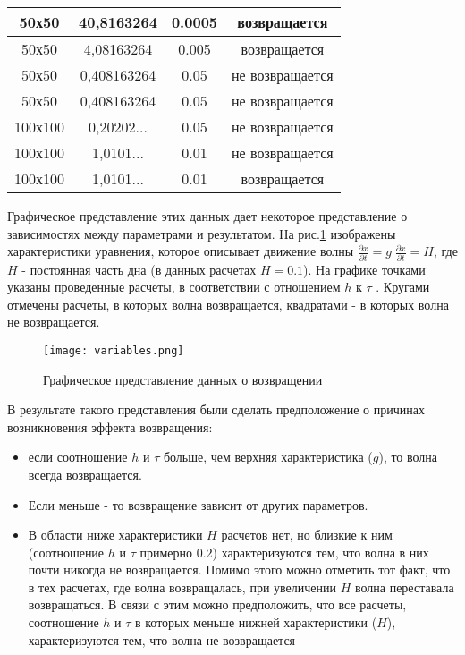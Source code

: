 \begin{table}[p]
\begin{center}
\begin{tabular}{|c|c|c|c|}
	    \hline
	    50х50 & 40,8163264 & 0.0005 & возвращается\\
	    \hline
	    50х50 & 4,08163264 & 0.005 & возвращается\\
	    \hline
	    50х50 & 0,408163264 & 0.05 & не возвращается\\
	    \hline
	    50х50 & 0,408163264 & 0.05 & не возвращается\\
	    \hline
	    100х100 & 0,20202... & 0.05 & не возвращается\\
	    \hline
	    100х100 & 1,0101... & 0.01 & не возвращается\\
	    \hline
	    100х100 & 1,0101... & 0.01 & возвращается\\
	    \hline
	\end{tabular}
    \end{center}
\end{table}

Графическое представление этих данных дает некоторое представление о зависимостях между параметрами и результатом.
На рис.\ref{fig:VariablesGraph} изображены характеристики \nocite{yanenko} уравнения, которое описывает движение волны $\frac{\partial x}{\partial t}=g\;\frac{\partial x}{\partial t}=H $, где $H$ - постоянная часть дна (в данных расчетах $H=0.1$). На графике точками указаны проведенные расчеты, в соответствии с отношением $h$ к $\tau$ . Кругами отмечены расчеты, в которых волна возвращается, квадратами - в которых волна не возвращается.

\begin{figure}[H]
    \centering
    \texttt{[image: variables.png]}
    \caption{Графическое представление данных о возвращении}
    \label{fig:VariablesGraph}
\end{figure}

\newpage
В результате такого представления были сделать предположение о причинах возникновения эффекта возвращения:
\begin{itemize} 
    \item если соотношение $h$ и $\tau$ больше, чем верхняя характеристика ($g$), то волна всегда возвращается.
    \item Если меньше - то возвращение зависит от других параметров.
    \item В области ниже характеристики $H$  расчетов нет, но близкие к ним (соотношение $h$ и $\tau$ примерно $0.2$) характеризуются тем, что волна в них почти никогда не возвращается. Помимо этого можно отметить тот факт, что в тех расчетах, где волна возвращалась, при увеличении $H$ волна переставала возвращаться. В связи с этим можно предположить, что все расчеты, соотношение $h$ и $\tau$ в которых меньше нижней характеристики ($H$), характеризуются тем, что волна не возвращается
\end{itemize}

